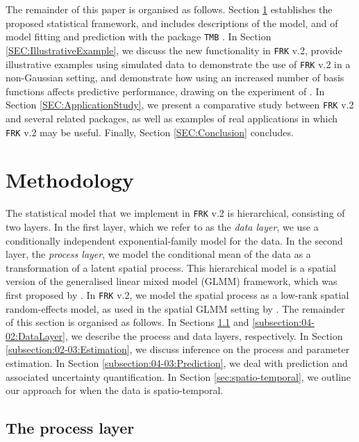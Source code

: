 \documentclass[12pt,a4paper]{article}
\begin{document}
The remainder of this paper is organised as follows. 
Section \ref{SEC:Methodology} establishes the proposed statistical framework, and includes descriptions of the model, and of model fitting and prediction with the package \texttt{TMB} \citep{Kristensen_2016_TMB}. 
In Section \ref{SEC:IllustrativeExample}, we discuss the new functionality in \texttt{FRK} v.2, provide illustrative examples using simulated data to demonstrate the use of \texttt{FRK} v.2 in a non-Gaussian setting, and demonstrate how using an increased number of basis functions affects predictive performance, drawing on the experiment of \citet{Heaton_2019_comparative_study}. 
In Section \ref{SEC:ApplicationStudy}, we present a comparative study between \texttt{FRK} v.2 and several related packages, as well as examples of real applications in which \texttt{FRK} v.2 may be useful.  
Finally, Section \ref{SEC:Conclusion} concludes.%

\section{Methodology}\label{SEC:Methodology}

The statistical model that we implement in \texttt{FRK} v.2 is hierarchical, consisting of two layers. In the first layer, which we refer to as the \textit{data layer}, we use a conditionally independent exponential-family model for the data. 
In the second layer, the \textit{process layer}, we model the conditional mean of the data as a transformation of a latent spatial process. 
This hierarchical model is a spatial version of the generalised linear mixed model (GLMM) framework, which was first proposed by \citet{Diggle_1998_spatial_GLMM}. 
In \texttt{FRK} v.2, we model the spatial process as a low-rank spatial random-effects model, as used in the spatial GLMM setting by \cite{Sengupta_Cressie_2013_spatial_GLMM_FRK}. 
The remainder of this section is organised as follows. 
In Sections \ref{subsection:04-01:ProcessLayer} and \ref{subsection:04-02:DataLayer}, we describe the process and data layers, respectively. 
In Section \ref{subsection:02-03:Estimation}, we discuss inference on the process and parameter estimation.
In Section \ref{subsection:04-03:Prediction}, we deal with prediction and associated uncertainty quantification.
In Section \ref{sec:spatio-temporal}, we outline our approach for when the data is spatio-temporal.



\subsection{The process layer} \label{subsection:04-01:ProcessLayer}
\end{document}
